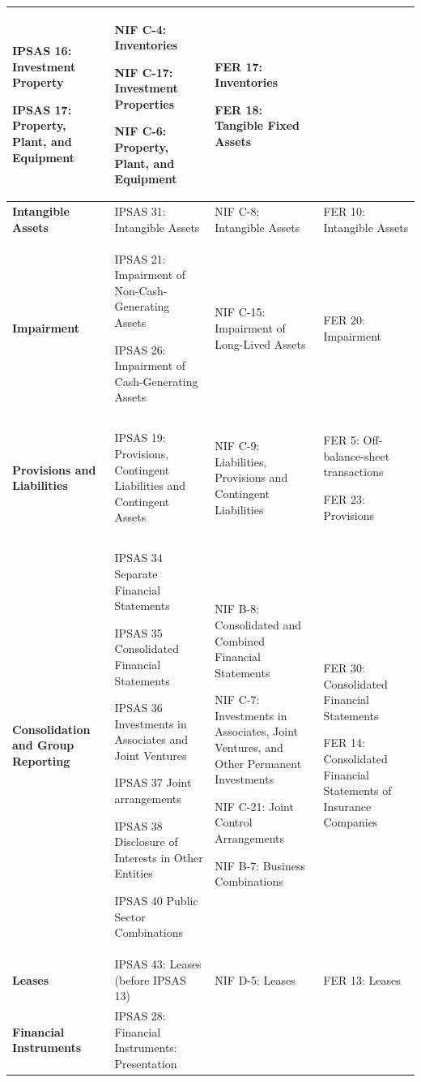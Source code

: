 \documentclass[10pt]{article}
\begin{document}
\begin{center}
\begin{longtable}{|>{\raggedright\arraybackslash}p{2.5cm}|>{\raggedright\arraybackslash}p{5cm}|>{\raggedright\arraybackslash}p{4cm}|>{\raggedright\arraybackslash}p{3cm}|}
IPSAS 16: Investment Property

IPSAS 17: Property, Plant, and Equipment

 & NIF C-4: Inventories

NIF C-17: Investment Properties

NIF C-6: Property, Plant, and Equipment

 & FER 17: Inventories

FER 18: Tangible Fixed Assets

 \\
\hline
\textbf{Intangible Assets} & IPSAS 31: Intangible Assets & NIF C-8: Intangible Assets & FER 10: Intangible Assets \\
\hline
\textbf{Impairment} & IPSAS 21: Impairment of Non-Cash-Generating Assets

IPSAS 26: Impairment of Cash-Generating Assets

 & NIF C-15: Impairment of Long-Lived Assets

 & FER 20: Impairment \\
\hline
\textbf{Provisions and Liabilities} & IPSAS 19: Provisions, Contingent Liabilities and Contingent Assets & NIF C-9: Liabilities, Provisions and Contingent Liabilities & FER 5: Off-balance-sheet transactions

FER 23: Provisions

 \\
\hline
\textbf{Consolidation and Group Reporting} & IPSAS 34 Separate Financial Statements

IPSAS 35 Consolidated Financial Statements

IPSAS 36 Investments in Associates and Joint Ventures

IPSAS 37 Joint arrangements

IPSAS 38 Disclosure of Interests in Other Entities

IPSAS 40 Public Sector Combinations

 & NIF B-8: Consolidated and Combined Financial Statements

NIF C-7: Investments in Associates, Joint Ventures, and Other Permanent Investments

NIF C-21: Joint Control Arrangements

NIF B-7: Business Combinations

 & FER 30: Consolidated Financial Statements

FER 14: Consolidated Financial Statements of Insurance Companies

 \\
\hline
\textbf{Leases} & IPSAS 43: Leases (before IPSAS 13) & NIF D-5: Leases & FER 13: Leases \\
\hline
\textbf{Financial Instruments} & IPSAS 28: Financial Instruments: Presentation


\end{longtable}
\end{center}
\end{document}
